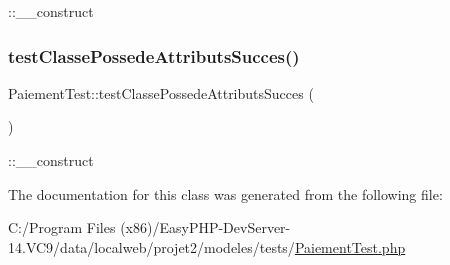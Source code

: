 \+::\+\_\+\+\_\+construct \mbox{\label{class_paiement_test_a20bde5d5b2f96a29802a96ebddc89f39}} 
\subsubsection{\texorpdfstring{test\+Classe\+Possede\+Attributs\+Succes()}{testClassePossedeAttributsSucces()}}
{\footnotesize\ttfamily Paiement\+Test\+::test\+Classe\+Possede\+Attributs\+Succes (\begin{DoxyParamCaption}{ }\end{DoxyParamCaption})}

\+::\+\_\+\+\_\+construct 

The documentation for this class was generated from the following file\+:\begin{DoxyCompactItemize}
\item 
C\+:/\+Program Files (x86)/\+Easy\+P\+H\+P-\/\+Dev\+Server-\/14.\+V\+C9/data/localweb/projet2/modeles/tests/\hyperlink{_paiement_test_8php}{Paiement\+Test.\+php}\end{DoxyCompactItemize}
